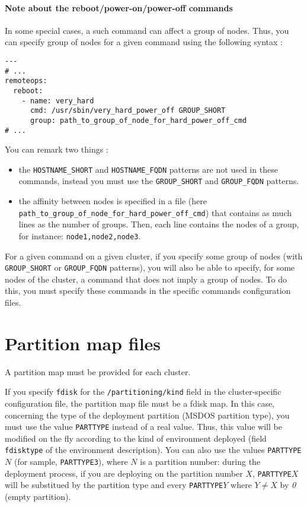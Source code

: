 \documentclass[a4wide,10pt,oneside]{book}
\newcommand{\ypath}[1]{\texttt{#1}}
\begin{document}
\paragraph{Note about the reboot/power-on/power-off commands}\label{sec:groupcmd}
In some special cases, a such command can affect a group of nodes. Thus, you can specify group of nodes for a given command using the following syntax :
\begin{small}
\begin{verbatim}
---
# ...
remoteops:
  reboot:
    - name: very_hard
      cmd: /usr/sbin/very_hard_power_off GROUP_SHORT
      group: path_to_group_of_node_for_hard_power_off_cmd
# ...
\end{verbatim}
\end{small}
You can remark two things :
\begin{itemize}
\item the \texttt{HOSTNAME\_SHORT} and \texttt{HOSTNAME\_FQDN} patterns are not used in these commands, instead you must use the \texttt{GROUP\_SHORT} and \texttt{GROUP\_FQDN} patterns.
\item the affinity between nodes is specified in a file (here \texttt{path\_to\_group\_of\_node\_for\_hard\_power\_off\_cmd}) that contains as much lines as the number of groups. Then, each line contains the nodes of a group, for instance: \texttt{node1,node2,node3}.
\end{itemize}
For a given command on a given cluster, if you specify some group of nodes (with \texttt{GROUP\_SHORT} or \texttt{GROUP\_FQDN} patterns), you will also be able to specify, for some nodes of the cluster, a command that does not imply a group of nodes. To do this, you must specify these commands in the specific commands configuration files.

\section{Partition map files}\label{sec:partfiles}
A partition map must be provided for each cluster. 

If you specify \texttt{fdisk} for the \ypath{/partitioning/kind} field in the cluster-specific configuration file, the partition map file must be a fdisk map. In this case, concerning the type of the deployment partition (MSDOS partition type), you must use the value \texttt{PARTTYPE} instead of a real value. Thus, this value will be modified on the fly according to the kind of environment deployed (field \texttt{fdisktype} of the environment description). You can also use the values \texttt{PARTTYPE}$N$ (for sample, \texttt{PARTTYPE3}), where $N$ is a partition number: during the deployment process, if you are deploying on the partition number $X$, \texttt{PARTTYPE}$X$ will be substitued by the partition type and every \texttt{PARTTYPE}$Y$ where $Y \neq X$ by \emph{0} (empty partition).
\end{document}

